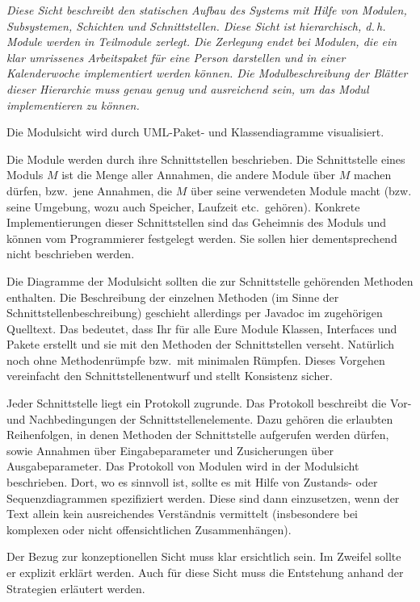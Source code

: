 \documentclass[enabledeprecatedfontcommands,fontsize=12pt,paper=a4,twoside]{scrartcl}
\begin{document}
{\it
Diese Sicht beschreibt den statischen Aufbau des Systems mit Hilfe von
Modulen, Subsystemen, Schichten und Schnittstellen.
Diese Sicht ist hierarchisch, d.\,h. Module werden in Teilmodule
zerlegt. Die Zerlegung endet bei Modulen, die ein klar umrissenes
Arbeitspaket für eine Person darstellen und in einer Kalenderwoche
implementiert werden können. Die Modulbeschreibung der Blätter dieser
Hierarchie muss genau genug und ausreichend sein, um das Modul
implementieren zu können.

Die Modulsicht wird durch {UML}-Paket- und Klassendiagramme visualisiert.

Die Module werden durch ihre Schnittstellen beschrieben.
Die Schnittstelle eines Moduls $M$ ist die Menge aller Annahmen, die
andere Module über $M$ machen dürfen, bzw.\ jene Annahmen, die $M$
über seine verwendeten Module macht (bzw. seine Umgebung, wozu auch
Speicher, Laufzeit etc.\ gehören).
Konkrete Implementierungen dieser Schnittstellen sind das Geheimnis des Moduls
und können vom Programmierer festgelegt werden. Sie sollen hier
dementsprechend nicht beschrieben werden.

Die Diagramme der Modulsicht sollten die zur Schnittstelle gehörenden Methoden
enthalten. Die Beschreibung der einzelnen Methoden (im Sinne der Schnittstellenbeschreibung)
geschieht allerdings per Javadoc im zugehörigen Quelltext. Das bedeutet, dass Ihr
für alle Eure Module Klassen, Interfaces und Pakete erstellt und sie mit den Methoden der
Schnittstellen verseht. Natürlich noch ohne Methodenrümpfe bzw.\ mit minimalen Rümpfen.
Dieses Vorgehen vereinfacht den Schnittstellenentwurf und stellt Konsistenz sicher.

Jeder Schnittstelle liegt ein
Protokoll zugrunde. Das Protokoll beschreibt die Vor- und
Nachbedingungen der Schnittstellenelemente. Dazu gehören die erlaubten
Reihenfolgen, in denen Methoden der Schnittstelle aufgerufen werden
dürfen, sowie Annahmen über Eingabeparameter und Zusicherungen über
Ausgabeparameter. Das Protokoll von Modulen wird in der Modulsicht beschrieben.
Dort, wo es sinnvoll ist, sollte es mit Hilfe von Zustands- oder
Sequenzdiagrammen spezifiziert werden. Diese sind dann einzusetzen, wenn der
Text allein kein ausreichendes Verständnis vermittelt (insbesondere
bei komplexen oder nicht offensichtlichen Zusammenhängen).

Der Bezug zur konzeptionellen Sicht muss klar ersichtlich sein. Im
Zweifel sollte er explizit erklärt werden. Auch für diese Sicht muss
die Entstehung anhand der Strategien erläutert werden.
}
\end{document}
